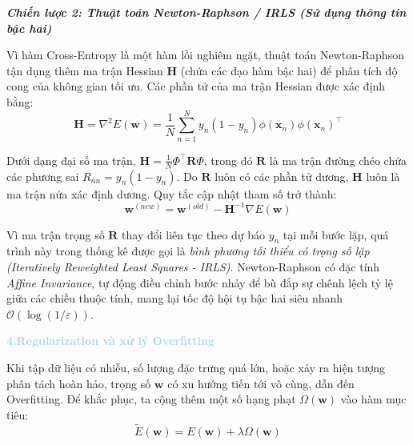 \vspace{0.5em}
\noindent\textit{\textbf{Chiến lược 2: Thuật toán Newton-Raphson / IRLS (Sử dụng thông tin bậc hai)}}

Vì hàm Cross-Entropy là một hàm lồi nghiêm ngặt, thuật toán Newton-Raphson tận dụng thêm ma trận Hessian $\mathbf{H}$ (chứa các đạo hàm bậc hai) để phân tích độ cong của không gian tối ưu. Các phần tử của ma trận Hessian được xác định bằng:
\begin{equation}
    \mathbf{H} = \nabla^2 E(\mathbf{w}) = \frac{1}{N} \sum_{n=1}^N y_n(1-y_n) \phi(\mathbf{x}_n) \phi(\mathbf{x}_n)^\top
\end{equation}

Dưới dạng đại số ma trận, $\mathbf{H} = \frac{1}{N} \Phi^\top \mathbf{R} \Phi$, trong đó $\mathbf{R}$ là ma trận đường chéo chứa các phương sai $R_{nn} = y_n(1 - y_n)$. Do $\mathbf{R}$ luôn có các phần tử dương, $\mathbf{H}$ luôn là ma trận nửa xác định dương. Quy tắc cập nhật tham số trở thành:
\begin{equation}
    \mathbf{w}^{(new)} = \mathbf{w}^{(old)} - \mathbf{H}^{-1} \nabla E(\mathbf{w})
\end{equation}

Vì ma trận trọng số $\mathbf{R}$ thay đổi liên tục theo dự báo $y_n$ tại mỗi bước lặp, quá trình này trong thống kê được gọi là \textit{bình phương tối thiểu có trọng số lặp (Iteratively Reweighted Least Squares - IRLS)}. Newton-Raphson có đặc tính \textit{Affine Invariance}, tự động điều chỉnh bước nhảy để bù đắp sự chênh lệch tỷ lệ giữa các chiều thuộc tính, mang lại tốc độ hội tụ bậc hai siêu nhanh $\mathcal{O}(\log(1/\varepsilon))$.

\vspace{0.5em}
\noindent\textcolor{lightblue}{\textbf{4.Regularization và xử lý Overfitting}}
\vspace{0.5em}

Khi tập dữ liệu có nhiễu, số lượng đặc trưng quá lớn, hoặc xảy ra hiện tượng phân tách hoàn hảo, trọng số $\mathbf{w}$ có xu hướng tiến tới vô cùng, dẫn đến Overfitting. Để khắc phục, ta cộng thêm một số hạng phạt $\Omega(\mathbf{w})$ vào hàm mục tiêu:
\begin{equation}
    \widetilde{E}(\mathbf{w}) = E(\mathbf{w}) + \lambda \Omega(\mathbf{w})
\end{equation}

